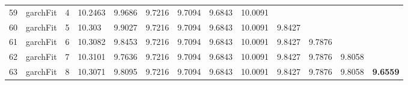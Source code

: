 \documentclass[10pt,a4paper]{article}
\begin{document}
\begin{table}[ht]
\begin{tabular}{rlrllllllllll}
  59 & garchFit &     4 & 10.2463 & 9.9686 & 9.7216 & 9.7094 & 9.6843 & 10.0091 &  &  &  &  \\ 
  60 & garchFit &     5 & 10.303 & 9.9027 & 9.7216 & 9.7094 & 9.6843 & 10.0091 & 9.8427 &  &  &  \\ 
  61 & garchFit &     6 & 10.3082 & 9.8453 & 9.7216 & 9.7094 & 9.6843 & 10.0091 & 9.8427 & 9.7876 &  &  \\ 
  62 & garchFit &     7 & 10.3101 & 9.7636 & 9.7216 & 9.7094 & 9.6843 & 10.0091 & 9.8427 & 9.7876 & 9.8058 &  \\ 
  63 & garchFit &     8 & 10.3071 & 9.8095 & 9.7216 & 9.7094 & 9.6843 & 10.0091 & 9.8427 & 9.7876 & 9.8058 & \textbf{9.6559} \\ 
   \hline
\end{tabular}
\end{table}
\end{document}
